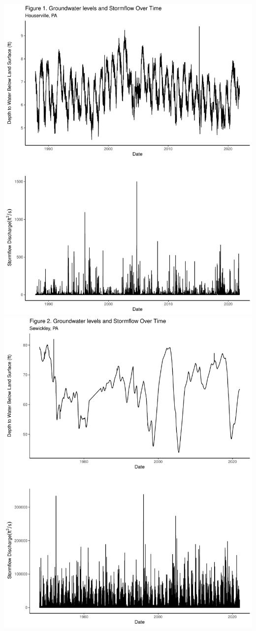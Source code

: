 \documentclass[
  12pt,
]{article}
\begin{document}
\includegraphics{Draft_Final_files/figure-latex/explore-1.pdf}
\includegraphics{Draft_Final_files/figure-latex/explore-2.pdf}
\end{document}
